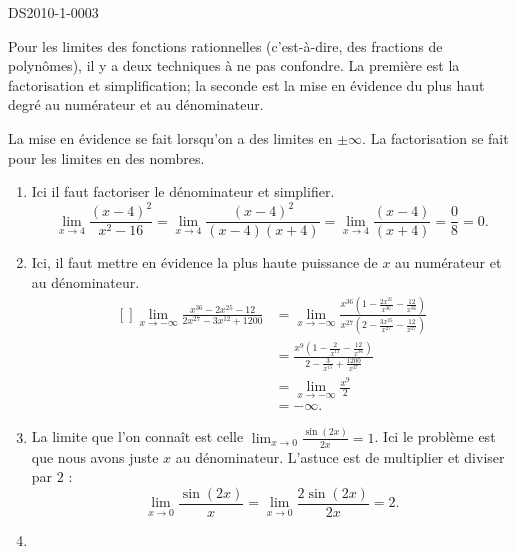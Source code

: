 
\begin{corrige}{DS2010-1-0003}


	Pour les limites des fonctions rationnelles (c'est-à-dire, des fractions de polynômes), il y a deux techniques à ne pas confondre. La première est la factorisation et simplification; la seconde est la mise en évidence du plus haut degré au numérateur et au dénominateur.

	La mise en évidence se fait lorsqu'on a des limites en $\pm\infty$. La factorisation se fait pour les limites en des nombres.
	\begin{enumerate}
		\item
			Ici il faut factoriser le dénominateur et simplifier.
			\begin{equation}
				\lim_{x\to 4} \frac{ (x-4)^2 }{ x^2-16 }=\lim_{x\to 4} \frac{ (x-4)^2 }{ (x-4)(x+4) }=\lim_{x\to 4} \frac{ (x-4) }{ (x+4) }=\frac{ 0 }{ 8 }=0.
			\end{equation}
		\item
			Ici, il faut mettre en évidence la plus haute puissance de $x$ au numérateur et au dénominateur.
			\begin{equation}
				\begin{aligned}[]
					\lim_{x\to -\infty} \frac{ x^{36}-2x^{25}-12 }{ 2x^{27}-3x^{12}+1200 }&=\lim_{x\to -\infty} \frac{ x^{36}\left( 1-\frac{ 2x^{25} }{ x^{36} }-\frac{ 12 }{ x^{36} } \right) }{ x^{27}\left( 2-\frac{ 3x^{25} }{ x^{27} }-\frac{ 12 }{ x^{27} } \right) }\\
					&=\frac{ x^9\left( 1-\frac{ 2 }{ x^{11} }-\frac{ 12 }{ x^{36} } \right) }{ 2-\frac{ 3 }{ x^{15} }+\frac{ 1200 }{ x^{27} } }\\
					&=\lim_{x\to -\infty} \frac{ x^{9} }{ 2 }\\
					&=-\infty.
				\end{aligned}
			\end{equation}
		\item
			La limite que l'on connaît est celle $\lim_{x\to 0} \frac{ \sin(2x) }{ 2x }=1$. Ici le problème est que nous avons juste $x$ au dénominateur. L'astuce est de multiplier et diviser par $2$ :
			\begin{equation}
				\lim_{x\to 0} \frac{ \sin(2x) }{ x }=\lim_{x\to 0} \frac{ 2\sin(2x) }{ 2x }=2.
			\end{equation}
		\item

\end{enumerate}
\end{corrige}

